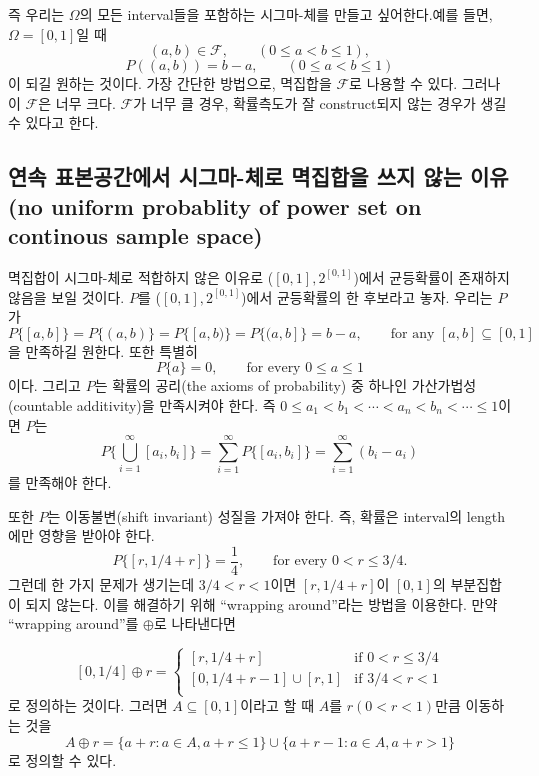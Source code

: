 \documentclass[b5paper,]{book}
\theoremstyle{definition}
\theoremstyle{definition}
\theoremstyle{definition}
\theoremstyle{remark}
\begin{document}
즉 우리는 \(\Omega\)의 모든 interval들을 포함하는 시그마-체를 만들고
싶어한다.예를 들면, \(\Omega=[0,1]\)일 때
\[(a,b)\in\mathcal{F}, \qquad{(0\leq a < b \leq 1),}\]
\[P((a,b))=b-a, \qquad{(0\leq a < b \leq 1)}\] 이 되길 원하는 것이다.
가장 간단한 방법으로, 멱집합을 \(\mathcal{F}\)로 나용할 수 있다. 그러나
이 \(\mathcal{F}\)은 너무 크다. \(\mathcal{F}\)가 너무 클 경우,
확률측도가 잘 construct되지 않는 경우가 생길 수 있다고 한다.

\subsection{연속 표본공간에서 시그마-체로 멱집합을 쓰지 않는 이유(no
uniform probablity of power set on continous sample
space)}\label{-------no-uniform-probablity-of-power-set-on-continous-sample-space}

멱집합이 시그마-체로 적합하지 않은 이유로 (\([0,1], 2^{[0,1]}\))에서
균등확률이 존재하지 않음을 보일 것이다. \(P\)를
(\([0,1], 2^{[0,1]}\))에서 균등확률의 한 후보라고 놓자. 우리는 \(P\)가
\[P\{[a,b]\}=P\{(a,b)\}=P\{[a,b)\}=P\{(a,b]\}=b-a, \qquad{\text{for any }[a,b]\subseteq [0,1]}\]
을 만족하길 원한다. 또한 특별히
\[P\{a\}=0, \qquad{\text{for every }0\leq a \leq 1}\] 이다. 그리고
\(P\)는 확률의 공리(the axioms of probability) 중 하나인
가산가법성(countable additivity)을 만족시켜야 한다. 즉
\(0\leq a_{1}<b_{1}<\cdots <a_{n}<b_{n}<\cdots \leq 1\)이면 \(P\)는
\[P\{\bigcup_{i=1}^{\infty}[a_{i},b_{i}]\}=\sum_{i=1}^{\infty}P\{[a_{i},b_{i}]\}=\sum_{i=1}^{\infty}(b_{i}-a_{i})\]
를 만족해야 한다.

또한 \(P\)는 이동불변(shift invariant) 성질을 가져야 한다. 즉, 확률은
interval의 length에만 영향을 받아야 한다.
\[P\{[r,1/4 +r]\}=\frac{1}{4}, \qquad{\text{for every } 0 < r \leq 3/4.}\]
그런데 한 가지 문제가 생기는데 \(3/4 <r < 1\)이면 \([r,1/4+r]\)이
\([0,1]\)의 부분집합이 되지 않는다. 이를 해결하기 위해 ``wrapping
around''라는 방법을 이용한다. 만약 ``wrapping around''를 \(\oplus\)로
나타낸다면

\[
[0,1/4]\oplus r = 
\begin{cases}
[r, 1/4 + r] & \text{if $0 < r \leq 3/4$} \\
[0,1/4+r-1]\cup [r,1] & \text{if $3/4 < r < 1$}\\
\end{cases}
\] 로 정의하는 것이다. 그러면 \(A\subseteq [0,1]\)이라고 할 때 \(A\)를
\(r (0<r<1)\)만큼 이동하는 것을
\[A\oplus r = \{ a+r : a \in A, a+r \leq 1 \} \cup \{ a+r-1: a\in A, a+r > 1\}\]
로 정의할 수 있다.
\end{document}
